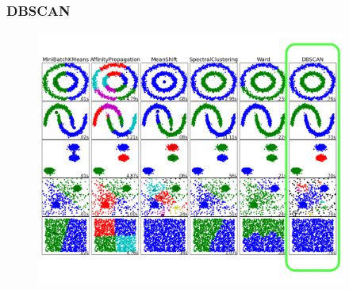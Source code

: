 \documentclass[xcolor={dvipsnames}]{beamer}
\begin{document}
\frame
{
 \frametitle{DBSCAN}

\begin{figure}
\centering
\includegraphics[width=4in]{stuffs/db2.png}
\end{figure}

}
\end{document}
